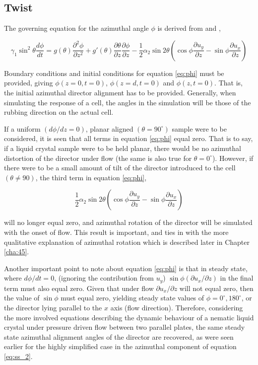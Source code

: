 \subsection{Twist}
\label{sec:phi}

The governing equation for the azimuthal angle $\phi$ is derived from \cite{Cornford2008} and \cite{Stewart2004},

\begin{equation}
\gamma_1 \sin^2\theta \frac{d\phi}{dt}=g\left(\theta\right)\frac{\partial^2\phi}{\partial z^2} + g'\left(\theta\right)\frac{\partial\theta}{\partial z}\frac{\partial\phi}{\partial z}-\frac{1}{2}\alpha_2\sin2\theta\left(\cos\phi\frac{\partial u_y}{\partial z}-\sin\phi\frac{\partial u_x}{\partial z}\right)
\label{eq:phi}
\end{equation}

\noindent Boundary conditions and initial conditions for equation \ref{eq:phi} must be provided, giving $\phi\left(z=0,t=0\right)$, $\phi\left(z=d,t=0\right)$ and $\phi\left(z,t=0\right)$. That is, the initial azimuthal director alignment has to be provided. Generally, when simulating the response of a cell, the angles in the simulation will be those of the rubbing direction on the actual cell.

If a uniform $\left(d\phi/dz=0\right)$, planar aligned $\left(\theta=90^{\circ}\right)$ sample were to be considered, it is seen that all terms in equation \ref{eq:phi} equal zero. That is to say, if a liquid crystal sample were to be held planar, there would be no azimuthal distortion of the director under flow (the same is also true for $\theta=0^{\circ}$). However, if there were to be a small amount of tilt of the director introduced to the cell $\left(\theta\neq90\right)$, the third term in equation \ref{eq:phi},

\begin{equation}
\frac{1}{2}\alpha_2\sin2\theta\left(\cos\phi\frac{\partial u_y}{\partial z}-\sin\phi\frac{\partial u_x}{\partial z}\right)
\end{equation}

\noindent will no longer equal zero, and azimuthal rotation of the director will be simulated with the onset of flow. This result is important, and ties in with the more qualitative explanation of azimuthal rotation which is described later in Chapter \ref{cha:45}.

Another important point to note about equation \ref{eq:phi} is that in steady state, where $d\phi/dt=0$, (ignoring the contribution from $u_y$) $\sin\phi\left(\partial u_x/\partial z\right)$ in the final term must also equal zero. Given that under flow $\partial u_x/\partial z$ will not equal zero, then the value of $\sin\phi$ must equal zero, yielding steady state values of $\phi=0^{\circ},180^{\circ}$, or the director lying parallel to the $x$ axis (flow direction). Therefore, considering the more involved equations describing the dynamic behaviour of a nematic liquid crystal under pressure driven flow between two parallel plates, the same steady state azimuthal alignment angles of the director are recovered, as were seen earlier for the highly simplified case in the azimuthal component of equation \ref{eq:ss_2}.

